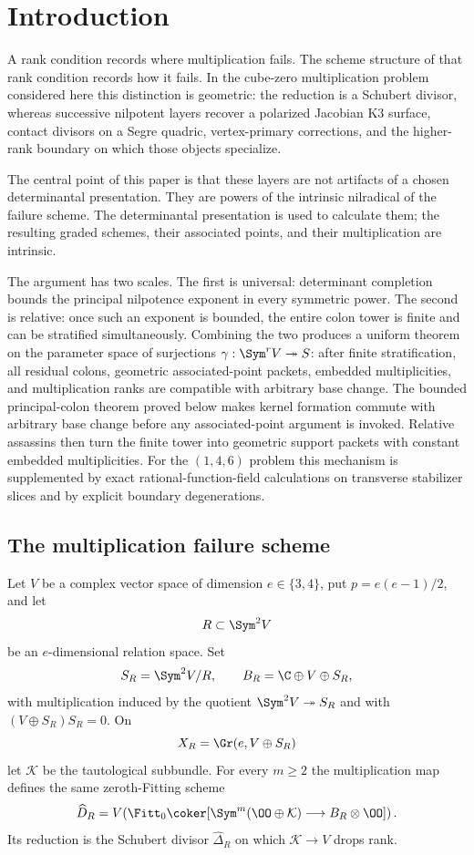 \section{Introduction}
\label{sec:introduction-v130}

A rank condition records where multiplication fails.  The scheme
structure of that rank condition records how it fails.  In the
cube-zero multiplication problem considered here this distinction is
geometric: the reduction is a Schubert divisor, whereas successive
nilpotent layers recover a polarized Jacobian K3 surface, contact
divisors on a Segre quadric, vertex-primary corrections, and the
higher-rank boundary on which those objects specialize.

The central point of this paper is that these layers are not artifacts
of a chosen determinantal presentation.  They are powers of the
intrinsic nilradical of the failure scheme.  The determinantal
presentation is used to calculate them; the resulting graded schemes,
their associated points, and their multiplication are intrinsic.

The argument has two scales.  The first is universal: determinant
completion bounds the principal nilpotence exponent in every symmetric
power.  The second is relative: once such an exponent is bounded, the
entire colon tower is finite and can be stratified simultaneously.
Combining the two produces a uniform theorem on the parameter space of
surjections \(\gamma:\Sym^rV\twoheadrightarrow S\): after finite
stratification, all residual colons, geometric associated-point packets,
embedded multiplicities, and multiplication ranks are compatible with
arbitrary base change.
The bounded principal-colon theorem proved below makes kernel formation
commute with arbitrary base change before any associated-point
argument is invoked.  Relative assassins then turn the finite tower
into geometric support packets with constant embedded multiplicities.
For the \((1,4,6)\) problem this mechanism is supplemented by exact
rational-function-field calculations on transverse stabilizer slices
and by explicit boundary degenerations.

\subsection{The multiplication failure scheme}

Let \(V\) be a complex vector space of dimension
\(e\in\{3,4\}\), put \(p=e(e-1)/2\), and let
\[
 R\subset\Sym^2V
\]
be an \(e\)-dimensional relation space.  Set
\[
 S_R=\Sym^2V/R,\qquad
 B_R=\C\oplus V\oplus S_R,
\]
with multiplication induced by the quotient
\(\Sym^2V\twoheadrightarrow S_R\) and with
\((V\oplus S_R)S_R=0\).  On
\[
 X_R=\Gr(e,V\oplus S_R)
\]
let \(\mathcal K\) be the tautological subbundle.  For every
\(m\ge2\) the multiplication map defines the same zeroth-Fitting
scheme
\begin{equation}\label{eq:failure-intro}
 \widehat D_R=
 V\!\left(
 \Fitt_0\coker[
 \Sym^m(\OO\oplus\mathcal K)\longrightarrow
 B_R\otimes\OO]\right).
\end{equation}
Its reduction is the Schubert divisor
\(\widehat\Delta_R\) on which \(\mathcal K\to V\) drops rank.

